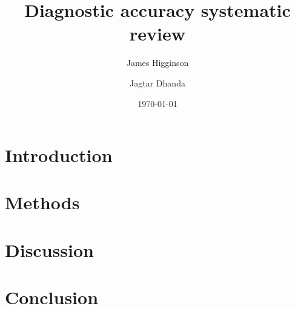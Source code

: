 

\title{Diagnostic accuracy systematic review}
\date{\today}
\author{
James Higginson \and
Jagtar Dhanda
}

  



\maketitle




\section{Introduction}



\section{Methods}


\section{Discussion}


\section{Conclusion}





\printbibliography






